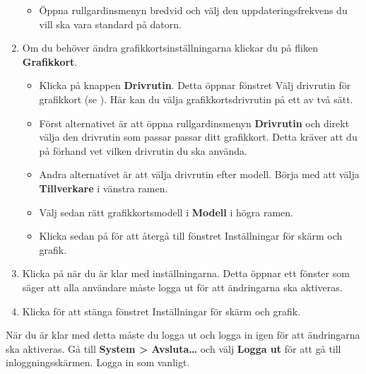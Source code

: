 \documentclass[a4paper,final]{memoir} %
\begin{document}
\begin{enumerate}
\begin{itemize}
\item Öppna rullgardinsmenyn bredvid och välj den uppdateringsfrekvens du vill ska vara standard på datorn. 

\end{itemize}

\item Om du behöver ändra grafikkortsinställningarna klickar du på fliken \textbf{Grafikkort}.

\begin{itemize}

\item Klicka på knappen \textbf{Drivrutin}. Detta öppnar fönstret Välj drivrutin för grafikkort (se ). Här kan du välja grafikkortsdrivrutin på ett av två sätt.


\item Först alternativet är att öppna rullgardinsmenyn \textbf{Drivrutin} och direkt välja den drivrutin som passar passar ditt grafikkort. Detta kräver att du på förhand vet vilken drivrutin du ska använda.

\item Andra alternativet är att välja drivrutin efter modell. Börja med att välja \textbf{Tillverkare} i vänstra ramen.

\item Välj sedan rätt grafikkortsmodell i \textbf{Modell} i högra ramen.

\item Klicka sedan på \xok{} för att återgå till fönstret Inställningar för skärm och grafik.

\end{itemize}

\item Klicka på \xok{} när du är klar med inställningarna. Detta öppnar ett fönster som säger att alla användare måste logga ut för att ändringarna ska aktiveras.

\item Klicka \xstang{} för att stänga fönstret Inställningar för skärm och grafik.

\end{enumerate}

När du är klar med detta måste du logga ut och logga in igen för att ändringarna ska aktiveras. Gå till \textbf{System \textgreater{} Avsluta\ldots{}} och välj \textbf{Logga ut} för att gå till inloggningsskärmen. Logga in som vanligt. 
\end{document}
